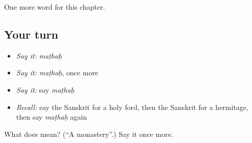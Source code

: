 \begin{grammarlens}[title={What you've built}]
One more word for this chapter.
\end{grammarlens}

\subsection*{Your turn}
\begin{itemize}
\raggedright
  \item \emph{Say it:} \emph{maṭhaḥ}
  \item \emph{Say it:} \emph{maṭhaḥ}, once more
  \item \emph{Say it:} say \emph{maṭhaḥ}
  \item \emph{Recall:} say the Sanskrit for a holy ford, then the Sanskrit for a hermitage, then say \emph{maṭhaḥ} again
\end{itemize}

\begin{tcolorbox}[breakable,colback=teal!4,colframe=teal!35!black,title={Before you move on}]
What does  mean? (\textquotedblleft{}A monastery\textquotedblright{}.) Say it once more.
\end{tcolorbox}

